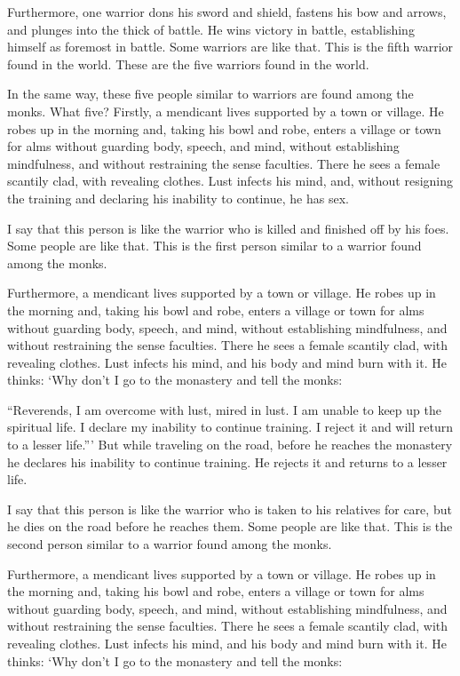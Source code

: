 \documentclass[12pt,openany]{book}%
\begin{document}
Furthermore, one warrior dons his sword and shield, fastens his bow and arrows, and plunges into the thick of battle. He wins victory in battle, establishing himself as foremost in battle. Some warriors are like that. This is the fifth warrior found in the world. These are the five warriors found in the world. 

In the same way, these five people similar to warriors are found among the monks. What five? Firstly, a mendicant lives supported by a town or village. He robes up in the morning and, taking his bowl and robe, enters a village or town for alms without guarding body, speech, and mind, without establishing mindfulness, and without restraining the sense faculties. There he sees a female scantily clad, with revealing clothes. Lust infects his mind, and, without resigning the training and declaring his inability to continue, he has sex. 

I say that this person is like the warrior who is killed and finished off by his foes. Some people are like that. This is the first person similar to a warrior found among the monks. 

Furthermore, a mendicant lives supported by a town or village. He robes up in the morning and, taking his bowl and robe, enters a village or town for alms without guarding body, speech, and mind, without establishing mindfulness, and without restraining the sense faculties. There he sees a female scantily clad, with revealing clothes. Lust infects his mind, and his body and mind burn with it. He thinks: ‘Why don’t I go to the monastery and tell the monks: 

“Reverends, I am overcome with lust, mired in lust. I am unable to keep up the spiritual life. I declare my inability to continue training. I reject it and will return to a lesser life.”’ But while traveling on the road, before he reaches the monastery he declares his inability to continue training. He rejects it and returns to a lesser life. 

I say that this person is like the warrior who is taken to his relatives for care, but he dies on the road before he reaches them. Some people are like that. This is the second person similar to a warrior found among the monks. 

Furthermore, a mendicant lives supported by a town or village. He robes up in the morning and, taking his bowl and robe, enters a village or town for alms without guarding body, speech, and mind, without establishing mindfulness, and without restraining the sense faculties. There he sees a female scantily clad, with revealing clothes. Lust infects his mind, and his body and mind burn with it. He thinks: ‘Why don’t I go to the monastery and tell the monks: 
\end{document}

